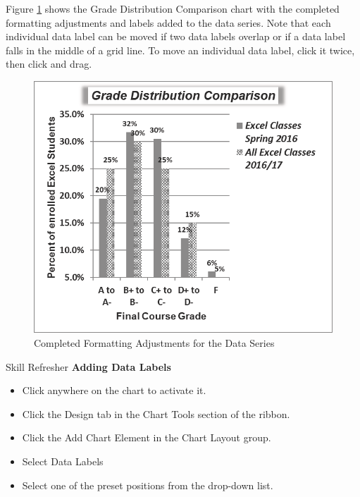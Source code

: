 Figure \ref{04:fig38} shows the Grade Distribution Comparison chart with the completed formatting adjustments and labels added to the data series. Note that each individual data label can be moved if two data labels overlap or if a data label falls in the middle of a grid line. To move an individual data label, click it twice, then click and drag.

\begin{figure}[H]
	\centering
	\includegraphics[width=\maxwidth{.95\linewidth}]{gfx/ch04_fig38}
	\caption{Completed Formatting Adjustments for the Data Series}
	\label{04:fig38}
\end{figure}

\begin{center}
	\begin{sklbox}{Skill Refresher}
		\textbf{Adding Data Labels}
		\\
		\begin{itemize}
			\setlength{\itemsep}{0pt}
			\setlength{\parskip}{0pt}
			\setlength{\parsep}{0pt}

			\item Click anywhere on the chart to activate it.
			\item Click the Design tab in the Chart Tools section of the ribbon.
			\item Click the Add Chart Element in the Chart Layout group.
			\item Select Data Labels
			\item Select one of the preset positions from the drop-down list.
			
		\end{itemize}
	\end{sklbox}
\end{center}

